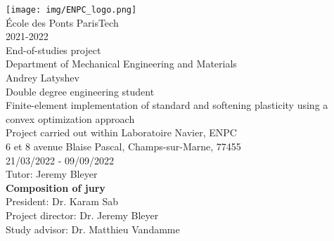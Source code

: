 \documentclass[12pt]{article}
\begin{document}
\begin{titlepage}
	{
        \center
	    \texttt{[image: img/ENPC\_logo.png]}\\[.44cm]
	    {\large École des Ponts ParisTech}\\[0.2cm]
	    {\normalsize 2021-2022}\\[.64cm]

	    {\Large End-of-studies project}\\[.5cm]
        {\large Department of Mechanical Engineering and Materials}\\[.85cm]
        {\Large Andrey Latyshev}\\[1cm]    
        {\large Double degree engineering student}\\[.85cm]

        {\Large Finite-element implementation of standard and softening plasticity using a convex optimization approach}\\[1cm]
        {\normalsize Project carried out within Laboratoire Navier, ENPC}\\[0.2cm]
	    {\normalsize 6 et 8 avenue Blaise Pascal, Champs-sur-Marne, 77455}\\[0.2cm]
        {\normalsize 21/03/2022 - 09/09/2022}\\[1.1cm]

        {\large Tutor: Jeremy Bleyer}\\[1.1cm]
    }
    \noindent \textbf{\normalsize Composition of jury}\\
    {\normalsize President: Dr. Karam Sab}\\
    {\normalsize Project director: Dr. Jeremy Bleyer}\\
    {\normalsize Study advisor: Dr. Matthieu Vandamme}
\end{titlepage}


\end{document}
